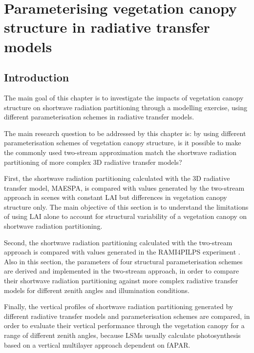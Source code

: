 \documentclass[a4paper,11pt]{report}
\title{}
\author{Renato Kerches Braghiere \\ This document was written in \LaTeX \\ Number of words: 11350}
\date{\today}
\begin{document}
\maketitle
\setcounter{chapter}{3} %

\chapter{Parameterising vegetation canopy structure in radiative transfer models}

\section{Introduction}\label{introduction}
The main goal of this chapter is to investigate the impacts of vegetation canopy structure on shortwave radiation partitioning through a modelling exercise, using different parameterisation schemes in radiative transfer models.

The main research question to be addressed by this chapter is: by using different parameterisation schemes of vegetation canopy structure, is it possible to make the commonly used two-stream approximation \citep{Sellers1985} match the shortwave radiation partitioning of more complex 3D radiative transfer models?

First, the shortwave radiation partitioning calculated with the 3D radiative transfer model, MAESPA, is compared with values generated by the two-stream approach in scenes with constant LAI but differences in vegetation canopy structure only. The main objective of this section is to understand the limitations of using LAI alone to account for structural variability of a vegetation canopy on shortwave radiation partitioning.

Second, the shortwave radiation partitioning calculated with the two-stream approach is compared with values generated in the RAMI4PILPS experiment \citep{Widlowski2011}. Also in this section, the parameters of four structural parameterisation schemes \citep{Nilson1971,Kucharik1999,pinty2006,Ni-Meister2010} are derived and implemented in the two-stream approach, in order to compare their shortwave radiation partitioning against more complex radiative transfer models for different zenith angles and illumination conditions.

Finally, the vertical profiles of shortwave radiation partitioning generated by different radiative transfer models and parameterisation schemes are compared, in order to evaluate their vertical performance through the vegetation canopy for a range of different zenith angles, because LSMs usually calculate photosynthesis based on a vertical multilayer approach dependent on fAPAR.
\end{document}
